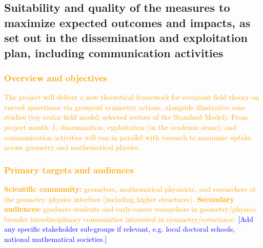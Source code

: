 \documentclass[11pt,draftproposal]{msca-pf}
\begin{document}

\subsection{Suitability and quality of the measures to maximize expected
    outcomes and impacts, as set out in the dissemination and exploitation plan,
    including communication activities }
\label{ssc:impact: outcomes}

\subsubsection*{\textcolor{orange}{Overview and objectives}}
\textcolor{orange}{The project will deliver a new theoretical framework for covariant field theory on curved spacetimes via groupoid symmetry actions, alongside illustrative case studies (toy scalar field model; selected sectors of the Standard Model). From project month~1, dissemination, exploitation (in the academic sense), and communication activities will run in parallel with research to maximise uptake across geometry and mathematical physics.}

\subsubsection*{\textcolor{orange}{Primary targets and audiences}}
\textcolor{orange}{\textbf{Scientific community:} geometers, mathematical physicists, and researchers at the geometry–physics interface (including higher structures).}
\textcolor{orange}{\textbf{Secondary audiences:} graduate students and early-career researchers in geometry/physics; broader interdisciplinary communities interested in symmetry/covariance.}
\textcolor{blue}{[Add any specific stakeholder sub-groups if relevant, e.g. local doctoral schools, national mathematical societies.]}
\end{document}
